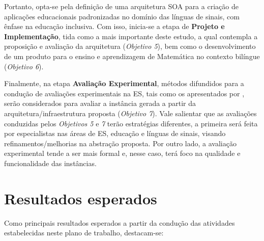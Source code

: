 Portanto, opta-se pela definição de uma arquitetura SOA para a criação de aplicações educacionais padronizadas no domínio das línguas de sinais, com ênfase na educação inclusiva. Com isso, inicia-se a etapa de \textbf{Projeto e Implementação}, tida como a mais importante deste estudo, a qual contempla a proposição e avaliação da arquitetura (\textit{Objetivo 5}), bem como o desenvolvimento de um produto para o ensino e aprendizagem de Matemática no contexto bilíngue (\textit{Objetivo 6}).

Finalmente, na etapa \textbf{Avaliação Experimental}, métodos difundidos para a condução de avaliações experimentais na ES, tais como os apresentados por , serão considerados para avaliar a instância gerada a partir da arquitetura/infraestrutura proposta (\textit{Objetivo 7}). Vale salientar que as avaliações conduzidas pelos \textit{Objetivos 5} e \textit{7} terão estratégias diferentes, a primeira será feita por especialistas nas áreas de ES, educação e línguas de sinais, visando refinamentos/melhorias na abstração proposta. Por outro lado, a avaliação experimental tende a ser mais formal e, nesse caso, terá foco na qualidade e funcionalidade das instâncias.

\section{Resultados esperados}

Como principais resultados esperados a partir da condução das atividades estabelecidas neste plano de trabalho, destacam-se:

